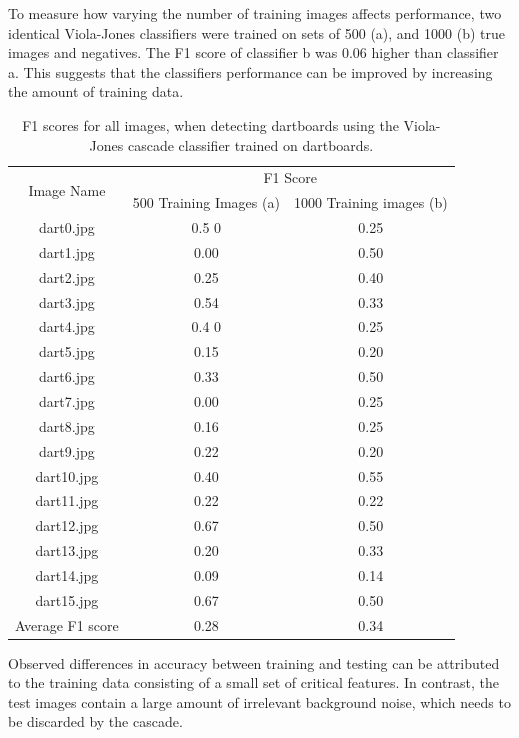 \documentclass[conference]{IEEEtran}
\begin{document}
To measure how varying the number of training images affects performance, two identical Viola-Jones classifiers were trained on sets of 500 (a), and 1000 (b) true images and negatives. The F1 score of classifier b was 0.06 higher than classifier a. This suggests that the classifiers performance can be improved by increasing the amount of training data. 
\begin{table}[!htb]
\caption{F1 scores for all images, when detecting dartboards using the Viola-Jones cascade classifier trained on dartboards.}
\begin{center}
\begin{tabular}{||c|c|c||}
\hline
\multirow{2}{*}{Image Name} & \multicolumn{2}{c||}{F1 Score}                \\ 
                                 & 500 Training Images (a)	& 1000 Training images (b) \\ \hline
dart0.jpg			& 0.5	0	&	0.25	\\
dart1.jpg			& 0.00	&	0.50	\\
dart2.jpg			& 0.25	&	0.40	\\
dart3.jpg			& 0.54	&	0.33	\\
dart4.jpg			& 0.4	0	&	0.25	\\
dart5.jpg			& 0.15	&	0.20	\\
dart6.jpg			& 0.33	&	0.50	\\
dart7.jpg			& 0.00	&	0.25	\\
dart8.jpg			& 0.16	&	0.25	\\
dart9.jpg			& 0.22	&	0.20	\\
dart10.jpg			& 0.40	&	0.55	\\
dart11.jpg			& 0.22	&	0.22	\\
dart12.jpg			& 0.67	&	0.50	\\
dart13.jpg			& 0.20	&	0.33	\\
dart14.jpg			& 0.09	&	0.14	\\
dart15.jpg			& 0.67	&	0.50	\\ \hline
Average F1 score 	& 0.28	&	0.34	\\ \hline
\end{tabular}
\end{center}
\label{default}
\end{table}%
\par
Observed differences in accuracy between training and testing can be attributed to the training data consisting of a small set of critical features. In contrast, the test images contain a large amount of irrelevant background noise, which needs to be discarded by the cascade. 
\end{document}
